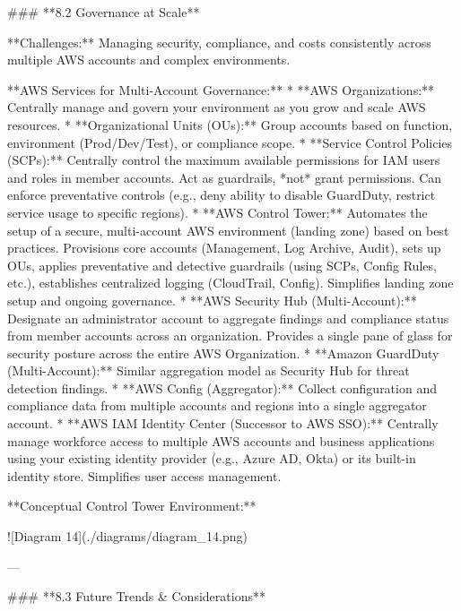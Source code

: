 \documentclass{article}
\begin{document}
### **8.2 Governance at Scale**

**Challenges:** Managing security, compliance, and costs consistently across multiple AWS accounts and complex environments.

**AWS Services for Multi-Account Governance:**
* **AWS Organizations:** Centrally manage and govern your environment as you grow and scale AWS resources.
    * **Organizational Units (OUs):** Group accounts based on function, environment (Prod/Dev/Test), or compliance scope.
    * **Service Control Policies (SCPs):** Centrally control the maximum available permissions for IAM users and roles in member accounts. Act as guardrails, *not* grant permissions. Can enforce preventative controls (e.g., deny ability to disable GuardDuty, restrict service usage to specific regions).
* **AWS Control Tower:** Automates the setup of a secure, multi-account AWS environment (landing zone) based on best practices. Provisions core accounts (Management, Log Archive, Audit), sets up OUs, applies preventative and detective guardrails (using SCPs, Config Rules, etc.), establishes centralized logging (CloudTrail, Config). Simplifies landing zone setup and ongoing governance.
* **AWS Security Hub (Multi-Account):** Designate an administrator account to aggregate findings and compliance status from member accounts across an organization. Provides a single pane of glass for security posture across the entire AWS Organization.
* **Amazon GuardDuty (Multi-Account):** Similar aggregation model as Security Hub for threat detection findings.
* **AWS Config (Aggregator):** Collect configuration and compliance data from multiple accounts and regions into a single aggregator account.
* **AWS IAM Identity Center (Successor to AWS SSO):** Centrally manage workforce access to multiple AWS accounts and business applications using your existing identity provider (e.g., Azure AD, Okta) or its built-in identity store. Simplifies user access management.

**Conceptual Control Tower Environment:**


![Diagram 14](./diagrams/diagram_14.png)



---

### **8.3 Future Trends & Considerations**
\end{document}
